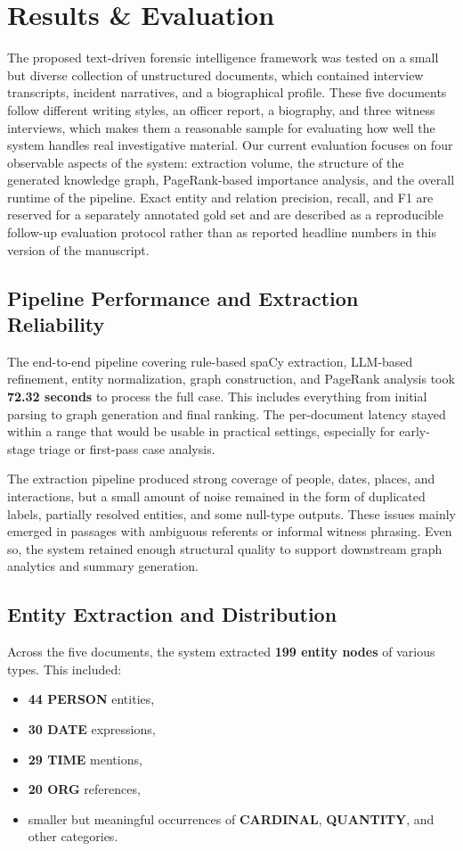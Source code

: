 \documentclass{ieeeaccess}
\begin{document}
\section{Results \& Evaluation}
The proposed text-driven forensic intelligence framework was tested on a small but diverse collection of unstructured documents, which contained interview transcripts, incident narratives, and a biographical profile. These five documents follow different writing styles, an officer report, a biography, and three witness interviews, which makes them a reasonable sample for evaluating how well the system handles real investigative material. Our current evaluation focuses on four observable aspects of the system: extraction volume, the structure of the generated knowledge graph, PageRank-based importance analysis, and the overall runtime of the pipeline. Exact entity and relation precision, recall, and F1 are reserved for a separately annotated gold set and are described as a reproducible follow-up evaluation protocol rather than as reported headline numbers in this version of the manuscript.

\subsection{Pipeline Performance and Extraction Reliability}

The end-to-end pipeline covering rule-based spaCy extraction, LLM-based refinement, entity normalization, graph construction, and PageRank analysis took \textbf{72.32 seconds} to process the full case. This includes everything from initial parsing to graph generation and final ranking. The per-document latency stayed within a range that would be usable in practical settings, especially for early-stage triage or first-pass case analysis.

The extraction pipeline produced strong coverage of people, dates, places, and interactions, but a small amount of noise remained in the form of duplicated labels, partially resolved entities, and some null-type outputs. These issues mainly emerged in passages with ambiguous referents or informal witness phrasing. Even so, the system retained enough structural quality to support downstream graph analytics and summary generation.

\subsection{Entity Extraction and Distribution}
Across the five documents, the system extracted \textbf{199 entity nodes} of various types. This included:
\begin{itemize}
\item \textbf{44 PERSON} entities,
\item \textbf{30 DATE} expressions,
\item \textbf{29 TIME} mentions,
\item \textbf{20 ORG} references,
\item smaller but meaningful occurrences of \textbf{CARDINAL}, \textbf{QUANTITY}, and other categories.
\end{itemize}
\end{document}
